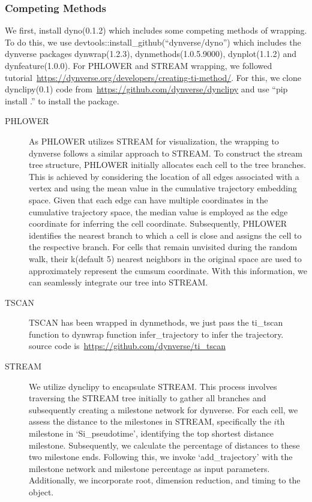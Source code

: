 \subsubsection{Competing Methods}
	We first, install dyno(0.1.2) which includes some competing methods of wrapping. To do this, we use devtools::install\_github(``dynverse/dyno'') which includes the dynverse packages dynwrap(1.2.3),  dynmethods(1.0.5.9000), dynplot(1.1.2) and dynfeature(1.0.0). For PHLOWER and STREAM wrapping, we followed tutorial~\url{https://dynverse.org/developers/creating-ti-method/}. For this, we clone dynclipy(0.1) code from~\url{https://github.com/dynverse/dynclipy} and use ``pip install .'' to install the package.
\begin{description}
	\item[PHLOWER] As PHLOWER utilizes STREAM for visualization, the wrapping to dynverse follows a similar approach to STREAM. To construct the stream tree structure, PHLOWER initially allocates each cell to the tree branches. This is achieved by considering the location of all edges associated with a vertex and using the mean value in the cumulative trajectory embedding space. Given that each edge can have multiple coordinates in the cumulative trajectory space, the median value is employed as the edge coordinate for inferring the cell coordinate. Subsequently, PHLOWER identifies the nearest branch to which a cell is close and assigns the cell to the respective branch. For cells that remain unvisited during the random walk, their k(default 5) nearest neighbors in the original space are used to approximately represent the cumsum coordinate. With this information, we can seamlessly integrate our tree into STREAM. 

	\item[TSCAN]
	TSCAN has been wrapped in dynmethods, we just pass the ti\_tscan function to dynwrap function infer\_trajectory to infer the trajectory. source code is~\url{https://github.com/dynverse/ti\_tscan}

	\item[STREAM] We utilize dynclipy to encapsulate STREAM. This process involves traversing the STREAM tree initially to gather all branches and subsequently creating a milestone network for dynverse. For each cell, we assess the distance to the milestones in STREAM, specifically the $i$th milestone in `Si\_pseudotime', identifying the top shortest distance milestone. Subsequently, we calculate the percentage of distances to these two milestone ends. Following this, we invoke `add\_trajectory' with the milestone network and milestone percentage as input parameters. Additionally, we incorporate root, dimension reduction, and timing to the object.


\end{description}
